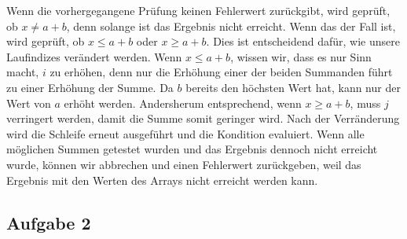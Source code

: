 \documentclass[a4paper,fleqn]{scrartcl}
\begin{document}
Wenn die vorhergegangene Prüfung keinen Fehlerwert zurückgibt,
wird geprüft, ob \(x \not= a + b\), denn solange ist das Ergebnis nicht erreicht.
Wenn das der Fall ist, wird geprüft, ob \(x \leq a + b\) oder \(x \geq a + b\).
Dies ist entscheidend dafür, wie unsere Laufindizes verändert werden. Wenn
\(x \leq a + b\), wissen wir, dass es nur Sinn macht, \(i\) zu erhöhen, denn
nur die Erhöhung einer der beiden Summanden führt zu einer Erhöhung der Summe.
Da \(b\) bereits den höchsten Wert hat, kann nur der Wert von \(a\) erhöht werden.
Andersherum entsprechend, wenn \(x \geq a + b\), muss \(j\) verringert werden,
damit die Summe somit geringer wird. Nach der Verränderung wird die Schleife
erneut ausgeführt und die Kondition evaluiert.
Wenn alle möglichen Summen getestet wurden und das Ergebnis dennoch nicht erreicht wurde,
können wir abbrechen und einen Fehlerwert zurückgeben, weil das Ergebnis mit 
den Werten des Arrays nicht erreicht werden kann.

\subsection*{Aufgabe 2}
\end{document}
